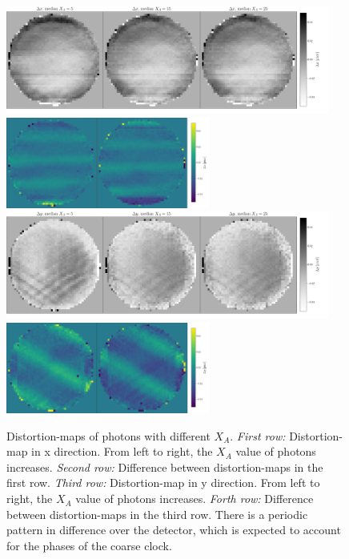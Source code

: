 \documentclass[12pt, preprint]{aastex}
\begin{document}
\begin{figure}[p]
\begin{center}
\includegraphics[width=0.95\textwidth]{figures/xa-x}
\includegraphics[width=0.6\textwidth]{figures/dif-xa-x}
\includegraphics[width=0.95\textwidth]{figures/xa-y}
\includegraphics[width=0.6\textwidth]{figures/dif-xa-y}

\end{center}
\caption{%
  \label{distortion_xa}
  Distortion-maps of photons with different $X_A$.
  \emph{First row:} Distortion-map in x direction.
  From left to right, the $X_A$ value of photons increases.
  \emph{Second row:} Difference between distortion-maps in the first row.
  \emph{Third row:} Distortion-map in y direction.
  From left to right, the $X_A$ value of photons increases.
  \emph{Forth row:} Difference between distortion-maps in the third row.
  There is a periodic pattern in difference over the detector, which is expected to account for the phases of the coarse clock.
  }
\end{figure}
\end{document}
